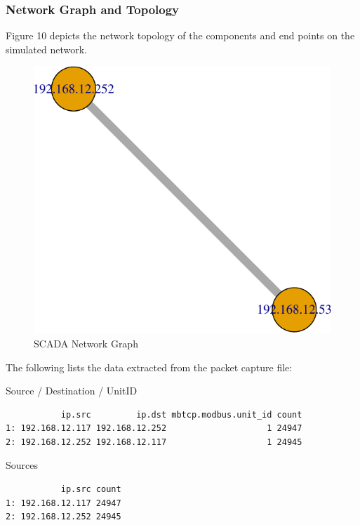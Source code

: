 \documentclass[11pt,]{article}
\begin{document}
\subsubsection{Network Graph and
Topology}\label{network-graph-and-topology}

Figure 10 depicts the network topology of the components and end points
on the simulated network.

\begin{figure}

{\centering \includegraphics{thesis_files/figure-latex/warning-1} 

}

\caption{SCADA Network Graph}\label{fig:warning}
\end{figure}

The following lists the data extracted from the packet capture file:

Source / Destination / UnitID

\begin{verbatim}
           ip.src         ip.dst mbtcp.modbus.unit_id count
1: 192.168.12.117 192.168.12.252                    1 24947
2: 192.168.12.252 192.168.12.117                    1 24945
\end{verbatim}

Sources

\begin{verbatim}
           ip.src count
1: 192.168.12.117 24947
2: 192.168.12.252 24945
\end{verbatim}
\end{document}
